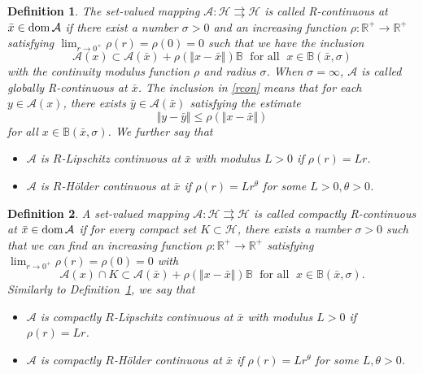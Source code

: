 \documentclass[12pt]{article}
\newcommand{\ball}{\mathbb{B}}
\theoremstyle{plain}
\newtheorem{definition}{Definition}
\newcommand\dom{{\rm dom}}%
\begin{document}
\begin{definition}\label{rdef}
The set-valued mapping \noindent $\mathcal{A}:\mathcal{H} \rightrightarrows \mathcal{H}$ is called {\sc R-continuous} at ${\bar x}\in\dom\,\mathcal{A}$ if there exist a number $\sigma>0$ and an {increasing} function $\rho: \mathbb{R}^+\to \mathbb{R}^+$ satisfying $\lim_{r\to 0^+}\rho(r)=\rho(0)=0$ such that we have the inclusion
\begin{equation}\label{rcon}
\mathcal{A}(x) \subset \mathcal{A}({\bar x}  )+\rho(\Vert x-{\bar x}   \Vert)\ball\;\mbox{ for all }\;x\in  \ball({\bar x} ,\sigma)
\end{equation}
with the {\sc continuity modulus function} $\rho$ and {\sc radius} $\sigma$. When $\sigma=\infty$, $\mathcal{A}$ is  called {\sc globally R-continuous} at ${\bar x}$. The inclusion in \eqref{rcon} means that for each $y\in \mathcal{A}(x)$, there exists ${\bar y}  \in  \mathcal{A}({\bar x} )$ satisfying the estimate 
$$
\Vert y-{\bar y}  \Vert\le \rho(\Vert x-{\bar x}   \Vert)
$$ 
for all $x\in \ball({\bar x},\sigma)$. We further say that 
\begin{itemize}
\item $\mathcal{A}$ is {\sc $R$-Lipschitz continuous} at ${\bar x}  $ with modulus {$L>0$}  if $\rho( r)=Lr$.
\item $\mathcal{A}$ is {\sc $R$-H\"older continuous} at ${\bar x}  $  if $\rho( r)=Lr^\theta$ for some $L>0, \theta>0$.
\end{itemize}
\end{definition}\vspace*{0.05in}

\begin{definition}\label{crdef}
A set-valued mapping \noindent $\mathcal{A}:\mathcal{H} \rightrightarrows \mathcal{H}$ is  called {\sc compactly 
R-continuous} at ${\bar x}\in\dom\,\mathcal{A}$ if for every compact set $K\subset {\mathcal{H}}$, there exists a number $\sigma>0$ such that we can find an {increasing}  function $\rho: \mathbb{R}^+\to \mathbb{R}^+$ satisfying $\lim_{r\to 0^+}\rho(r)=\rho(0)=0$ with
\begin{equation*}\label{rconc}
\mathcal{A}(x)\cap K \subset \mathcal{A}({\bar x}  )+\rho(\Vert x-{\bar x}   \Vert)\ball\;\mbox{ for all }\;x\in  \ball({\bar x} ,\sigma).
\end{equation*}
Similarly to Definition~{\rm\ref{rdef}}, we say that 
\begin{itemize}
\item $\mathcal{A}$ is {\sc compactly $R$-Lipschitz continuous} at ${\bar x} $ with modulus $L>0$ if $\rho( r)=Lr$.

\item $\mathcal{A}$ is {\sc compactly $R$-H\"older continuous} at ${\bar x}$ if $\rho( r)=Lr^\theta$ for some 
$L, \theta>0$.
\end{itemize}
\end{definition}\vspace*{0.05in}
\end{document}

